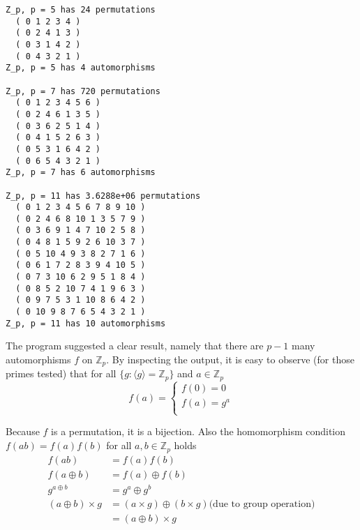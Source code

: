\documentclass[10pt]{article}
\newcommand*{\Zp}{\mathbb{Z}_p }
\begin{document}
\begin{enumerate}
\begin{enumerate}
\begin{lstlisting}
Z_p, p = 5 has 24 permutations
  ( 0 1 2 3 4 )
  ( 0 2 4 1 3 )
  ( 0 3 1 4 2 )
  ( 0 4 3 2 1 )
Z_p, p = 5 has 4 automorphisms

Z_p, p = 7 has 720 permutations
  ( 0 1 2 3 4 5 6 )
  ( 0 2 4 6 1 3 5 )
  ( 0 3 6 2 5 1 4 )
  ( 0 4 1 5 2 6 3 )
  ( 0 5 3 1 6 4 2 )
  ( 0 6 5 4 3 2 1 )
Z_p, p = 7 has 6 automorphisms

Z_p, p = 11 has 3.6288e+06 permutations
  ( 0 1 2 3 4 5 6 7 8 9 10 )
  ( 0 2 4 6 8 10 1 3 5 7 9 )
  ( 0 3 6 9 1 4 7 10 2 5 8 )
  ( 0 4 8 1 5 9 2 6 10 3 7 )
  ( 0 5 10 4 9 3 8 2 7 1 6 )
  ( 0 6 1 7 2 8 3 9 4 10 5 )
  ( 0 7 3 10 6 2 9 5 1 8 4 )
  ( 0 8 5 2 10 7 4 1 9 6 3 )
  ( 0 9 7 5 3 1 10 8 6 4 2 )
  ( 0 10 9 8 7 6 5 4 3 2 1 )
Z_p, p = 11 has 10 automorphisms

          \end{lstlisting}

          The program suggested a clear result, namely that there are $p - 1$
          many automorphisms $f$ on $\Zp$. By inspecting the output, it is easy
          to observe (for those primes tested) that for all $\{g : \langle g \rangle = \Zp\}$
          and $a \in \Zp$ $$
          f(a) = \begin{cases}
            f(0) = 0 \\
            f(a) = g^a \\
          \end{cases}
          $$

          Because $f$ is a permutation, it is a bijection. Also the
          homomorphism condition $f(ab) = f(a)f(b)$ for all $a, b \in
          \mathbb{Z}_p$ holds
          \begin{align*}
            f(ab)  &= f(a)f(b) \\
            f(a \oplus b)  &= f(a) \oplus f(b) \\
            g^{a \oplus b} &= g^a \oplus g^b \\
                   (a \oplus b) \times g &= (a \times g) \oplus (b \times g)  \text{(due to group operation)} \\
                   &= (a \oplus b) \times g 
          \end{align*}

      \end{enumerate}

  \end{enumerate}
\end{document}
